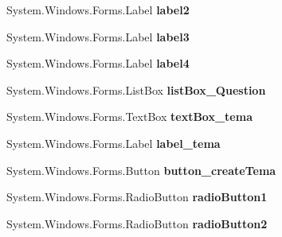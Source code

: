 \begin{DoxyCompactItemize}
\item 
System.\+Windows.\+Forms.\+Label {\bfseries label2}\hypertarget{class_tests_1_1_adminka_a4e29fe60d58caf22ebd38a346fe0642b}{}\label{class_tests_1_1_adminka_a4e29fe60d58caf22ebd38a346fe0642b}

\item 
System.\+Windows.\+Forms.\+Label {\bfseries label3}\hypertarget{class_tests_1_1_adminka_a1fd7ef809e9adab2568fd45e3b2c2206}{}\label{class_tests_1_1_adminka_a1fd7ef809e9adab2568fd45e3b2c2206}

\item 
System.\+Windows.\+Forms.\+Label {\bfseries label4}\hypertarget{class_tests_1_1_adminka_a6d79a07b77f8747b51fc2fdae76cd37e}{}\label{class_tests_1_1_adminka_a6d79a07b77f8747b51fc2fdae76cd37e}

\item 
System.\+Windows.\+Forms.\+List\+Box {\bfseries list\+Box\+\_\+\+Question}\hypertarget{class_tests_1_1_adminka_a2fdae13c03c82b36031341dd4990803f}{}\label{class_tests_1_1_adminka_a2fdae13c03c82b36031341dd4990803f}

\item 
System.\+Windows.\+Forms.\+Text\+Box {\bfseries text\+Box\+\_\+tema}\hypertarget{class_tests_1_1_adminka_a8636ea15196a859ed3d64c6f32ea5afc}{}\label{class_tests_1_1_adminka_a8636ea15196a859ed3d64c6f32ea5afc}

\item 
System.\+Windows.\+Forms.\+Label {\bfseries label\+\_\+tema}\hypertarget{class_tests_1_1_adminka_ad8ff4a93c8081fe3b0bf11d4dc72e07f}{}\label{class_tests_1_1_adminka_ad8ff4a93c8081fe3b0bf11d4dc72e07f}

\item 
System.\+Windows.\+Forms.\+Button {\bfseries button\+\_\+create\+Tema}\hypertarget{class_tests_1_1_adminka_a0e4ec04e750e175c7d5704e1332dceae}{}\label{class_tests_1_1_adminka_a0e4ec04e750e175c7d5704e1332dceae}

\item 
System.\+Windows.\+Forms.\+Radio\+Button {\bfseries radio\+Button1}\hypertarget{class_tests_1_1_adminka_abc6ff687eb6405c378c69eb77c0a531c}{}\label{class_tests_1_1_adminka_abc6ff687eb6405c378c69eb77c0a531c}

\item 
System.\+Windows.\+Forms.\+Radio\+Button {\bfseries radio\+Button2}\hypertarget{class_tests_1_1_adminka_aa749fca4eac152a213b3e82e9e530374}{}\label{class_tests_1_1_adminka_aa749fca4eac152a213b3e82e9e530374}


\end{DoxyCompactItemize}
